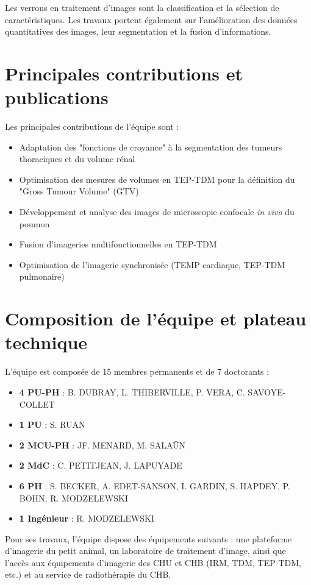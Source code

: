 \documentclass[12pt,a4paper]{report}
\begin{document}
Les verrous en traitement d'images sont la classification et la sélection de caractéristiques. Les travaux portent également sur l'amélioration des données quantitatives des images, leur segmentation et la fusion d'informations.

\section{Principales contributions et publications}

Les principales contributions de l'équipe sont :

\begin{itemize}
\item Adaptation des "fonctions de croyance" à la segmentation des tumeurs thoraciques et du volume rénal
\item Optimisation des mesures de volumes en TEP-TDM pour la définition du "Gross Tumour Volume" (GTV)
\item Développement et analyse des images de microscopie confocale \textit{in vivo} du poumon
\item Fusion d'imageries multifonctionnelles en TEP-TDM
\item Optimisation de l'imagerie synchronisée (TEMP cardiaque, TEP-TDM pulmonaire)
\end{itemize}

\section{Composition de l'équipe et plateau technique}

L'équipe est composée de 15 membres permanents et de 7 doctorants :

\begin{itemize}
\item \textbf{4 PU-PH} : B. DUBRAY, L. THIBERVILLE, P. VERA, C. SAVOYE-COLLET
\item \textbf{1 PU} : S. RUAN
\item \textbf{2 MCU-PH} : JF. MENARD, M. SALAÜN
\item \textbf{2 MdC} : C. PETITJEAN, J. LAPUYADE
\item \textbf{6 PH} : S. BECKER, A. EDET-SANSON, I. GARDIN, S. HAPDEY, P. BOHN, R. MODZELEWSKI
\item \textbf{1 Ingénieur} : R. MODZELEWSKI
\end{itemize}

Pour ses travaux, l'équipe dispose des équipements suivants : une plateforme d'imagerie du petit animal, un laboratoire de traitement d'image, ainsi que l'accès aux équipements d'imagerie des CHU et CHB (IRM, TDM, TEP-TDM, etc.) et au service de radiothérapie du CHB.
\end{document}
